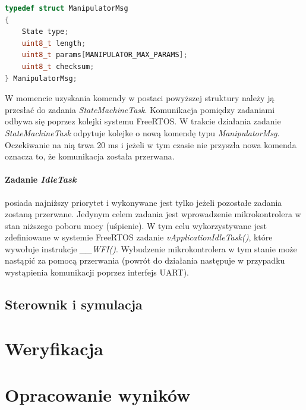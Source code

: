 \documentclass[a4paper, 12pt, twoside]{article}
\begin{document}
\begin{lstlisting}[language=C++,
                   directivestyle={\color{black}}
                   emph={int,char,double,float,unsigned},
                   emphstyle={\color{blue}}
                  ]
typedef struct ManipulatorMsg
{
	State type;
    uint8_t length;
    uint8_t params[MANIPULATOR_MAX_PARAMS];
    uint8_t checksum;
} ManipulatorMsg;
\end{lstlisting}

W momencie uzyskania komendy w postaci powyższej struktury należy ją przesłać do zadania \textit{StateMachineTask}. Komunikacja pomiędzy zadaniami odbywa się poprzez kolejki systemu FreeRTOS. W trakcie działania zadanie \textit{StateMachineTask} odpytuje kolejke o nową komendę typu \textit{ManipulatorMsg}. Oczekiwanie na nią trwa 20 ms i jeżeli w tym czasie nie przyszła nowa komenda oznacza to, że komunikacja została przerwana. 

\paragraph{Zadanie \textit{IdleTask}} posiada najniższy priorytet i wykonywane jest tylko jeżeli pozostałe zadania zostaną przerwane. Jedynym celem zadania jest wprowadzenie mikrokontrolera w stan niższego poboru mocy (uśpienie). W tym celu wykorzystywane jest zdefiniowane w systemie FreeRTOS zadanie \textit{vApplicationIdleTask()}, które wywołuje instrukcje \textit{\_\_WFI()}. Wybudzenie mikrokontrolera w tym stanie może nastąpić za pomocą przerwania (powrót do działania następuje w przypadku wystąpienia komunikacji poprzez interfejs UART).

\subsection{Sterownik i symulacja}
\vspace{1.5 cm}


\newpage
\vspace*{1.5 cm}
\section{Weryfikacja}
\vspace{1.5 cm}


\newpage
\vspace*{1.5 cm}
\section{Opracowanie wyników}  \label{wyniki}
\vspace{3.0 cm}
\vspace{1.0 cm}
\end{document}
